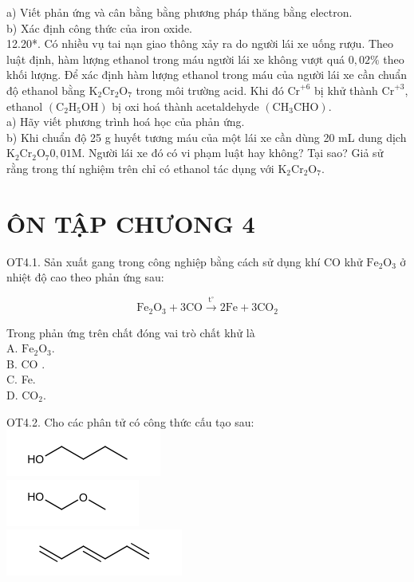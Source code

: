 \documentclass[10pt]{article}
\begin{document}
a) Viết phản ứng và cân bằng bằng phương pháp thăng bằng electron.\\
b) Xác định công thức của iron oxide.\\
12.20*. Có nhiều vụ tai nạn giao thông xảy ra do người lái xe uống rượu. Theo luật định, hàm lượng ethanol trong máu người lái xe không vượt quá $0,02 \%$ theo khối lượng. Để xác định hàm lượng ethanol trong máu của người lái xe cần chuẩn độ ethanol bằng $\mathrm{K}_{2} \mathrm{Cr}_{2} \mathrm{O}_{7}$ trong môi trường acid. Khi đó $\mathrm{Cr}^{+6}$ bị khử thành $\mathrm{Cr}^{+3}$, ethanol $\left(\mathrm{C}_{2} \mathrm{H}_{5} \mathrm{OH}\right)$ bị oxi hoá thành acetaldehyde $\left(\mathrm{CH}_{3} \mathrm{CHO}\right)$.\\
a) Hãy viết phương trình hoá học của phản ứng.\\
b) Khi chuẩn độ 25 g huyết tương máu của một lái xe cần dùng 20 mL dung dịch $\mathrm{K}_{2} \mathrm{Cr}_{2} \mathrm{O}_{7} 0,01 \mathrm{M}$. Người lái xe đó có vi phạm luật hay không? Tại sao? Giả sử rằng trong thí nghiệm trên chỉ có ethanol tác dụng với $\mathrm{K}_{2} \mathrm{Cr}_{2} \mathrm{O}_{7}$.

\section*{ÔN TẬP CHƯONG 4}
OT4.1. Sản xuất gang trong công nghiệp bằng cách sử dụng khí CO khử $\mathrm{Fe}_{2} \mathrm{O}_{3}$ ở nhiệt độ cao theo phản ứng sau:

$$
\mathrm{Fe}_{2} \mathrm{O}_{3}+3 \mathrm{CO} \xrightarrow{\mathrm{t}^{\circ}} 2 \mathrm{Fe}+3 \mathrm{CO}_{2}
$$

Trong phản ứng trên chất đóng vai trò chất khử là\\
A. $\mathrm{Fe}_{2} \mathrm{O}_{3}$.\\
B. CO .\\
C. Fe.\\
D. $\mathrm{CO}_{2}$.

OT4.2. Cho các phân tử có công thức cấu tạo sau:\\
\includegraphics{smile-0fc5a791cf282450699c8f3470338a3e1e399b14}\\
\includegraphics{smile-958568a22d3b651308cf7b8bb03c2c0fb39e5865}\\
\includegraphics{smile-769e7e0de1da77c25bd6b32b601a7db81ef32a22}
\end{document}
